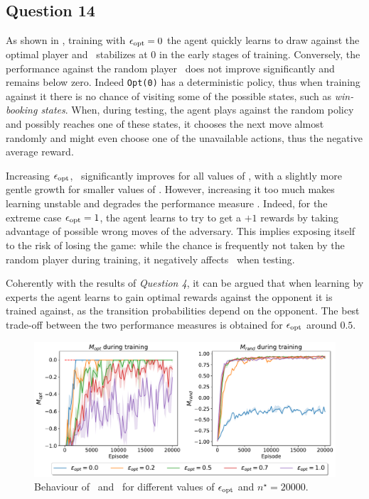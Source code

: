 \documentclass[10pt]{IEEEtran}
\begin{document}
\subsection*{Question 14}
As shown in , training with $\epsilon_{\text{opt}} = 0$ the agent quickly learns to draw against the optimal player and \mopt \ stabilizes at $0$ in the early stages of training. Conversely, the performance against the random player \mrand\  does not improve significantly and remains below zero. Indeed \texttt{Opt(0)} has a deterministic policy, thus when training against it there is no chance of visiting some of the possible states, such as \emph{win-booking states}. When, during testing, the agent plays against the random policy and possibly reaches one of these states, it chooses the next move almost randomly and might even choose one of the unavailable actions, thus the negative average reward. 

Increasing $\epsilon_{\text{opt}}$, \mrand\ significantly improves for all values of \eopt, with a slightly more gentle growth for smaller values of \eopt. However, increasing it too much makes learning unstable and degrades the performance measure \mopt. Indeed, for the extreme case $\epsilon_{\text{opt}} = 1$, the agent learns to try to get a $+1$ rewards by taking advantage of possible wrong moves of the adversary. This implies exposing itself to the risk of losing the game: while the chance is frequently not taken by the random player during training, it negatively affects \mopt\ when testing. 

Coherently with the results of \emph{Question 4}, it can be argued that when learning by experts the agent learns to gain optimal rewards against the opponent it is trained against, as the transition probabilities depend on the opponent. The best trade-off between the two performance measures is obtained for $\epsilon_{\text{opt}}$ around $0.5$. 
\begin{figure}[h]
    \centering
    \includegraphics[width = \linewidth]{code/figures/performance_dqn_epsilon_opt_experts.pdf}
    \caption{Behaviour of \mopt\  and \mrand\ for different values of $\epsilon_{\text{opt}}$ and $n^{\star} = 20000$.}
    \label{plot_question14}
\end{figure}
\end{document}
